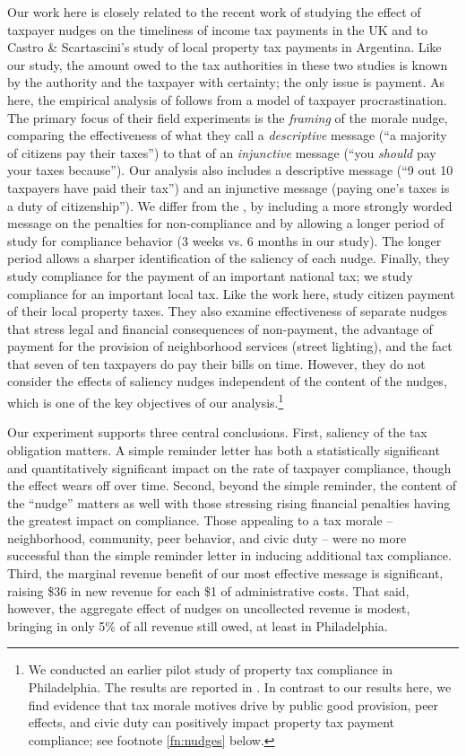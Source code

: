 \documentclass[12pt]{article}
\begin{document}
Our work here is closely related to the recent work of
 studying the effect of taxpayer nudges on the
timeliness of income tax payments in the UK and to Castro \& Scartascini's \citeyear{castro} study
of local property tax payments in Argentina.  Like our study, the
amount owed to the tax authorities in these two studies is known by
the authority and the taxpayer with certainty; the only issue is
payment. As here, the empirical analysis of 
follows from a model of taxpayer procrastination.  The primary focus
of their field experiments is the \textit{framing} of the morale
nudge, comparing the effectiveness of what they call a
\textit{descriptive} message (``a majority of citizens pay their
taxes'') to that of an \textit{injunctive} message (``you
\textit{should} pay your taxes because'').  Our analysis also includes
a descriptive message (``9 out 10 taxpayers have paid their tax'') and
an injunctive message (paying one's taxes is a duty of citizenship'').
We differ from the , by including a more strongly
worded message on the penalties for non-compliance and by allowing a
longer period of study for compliance behavior (3 weeks vs. 6 months
in our study).  The longer period allows a sharper identification of
the saliency of each nudge.  Finally, they study compliance for the
payment of an important national tax; we study compliance for an
important local tax.  Like the work
here,  study citizen payment of their local property
taxes. They also examine effectiveness of separate nudges that stress
legal and financial consequences of non-payment, the advantage of
payment for the provision of neighborhood services (street lighting),
and the fact that seven of ten taxpayers do pay their bills on
time. However, they do not consider the effects of saliency nudges
independent of the content of the nudges, which is one of the key
objectives of our analysis.\footnote{We conducted an earlier pilot study of
  property tax compliance in Philadelphia.  The results are reported
  in . In contrast to our results here, we find evidence that  tax morale motives drive by public good provision, peer effects, and civic duty can positively impact
  property tax payment compliance; see footnote \ref{fn:nudges} below.}

Our experiment supports three central conclusions. First, saliency of
the tax obligation matters. A simple reminder letter has both a
statistically significant and quantitatively significant impact on the
rate of taxpayer compliance, though the effect wears off over
time. Second, beyond the simple reminder, the content of the ``nudge''
matters as well with those stressing rising financial penalties having
the greatest impact on compliance. Those appealing to a tax morale --
neighborhood, community, peer behavior, and civic duty -- were no more
successful than the simple reminder letter in inducing additional tax
compliance. Third, the marginal revenue benefit of our most effective message is significant, raising \$36 in new revenue for each \$1 of administrative costs. That said, however, the aggregate effect of nudges on uncollected revenue is modest, bringing in only 5\% of all revenue still owed, at least in Philadelphia.
\end{document}
